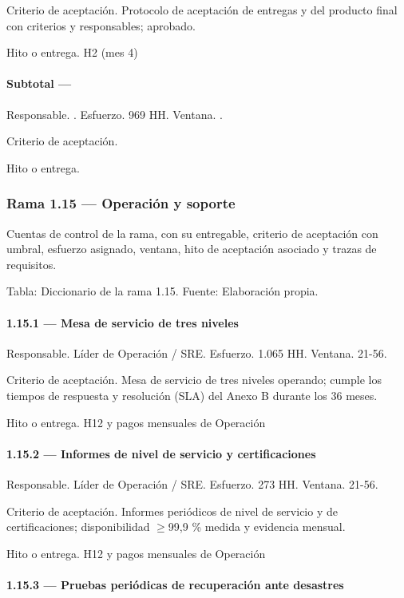 \documentclass[11pt]{article}
\begin{document}
Criterio de aceptación. Protocolo de aceptación de entregas y del producto final con criterios y responsables; aprobado.

Hito o entrega. H2 (mes 4)

\paragraph{Subtotal — }

Responsable. . Esfuerzo. 969 HH. Ventana. .

Criterio de aceptación.

Hito o entrega.

\subsubsection{Rama 1.15 — Operación y soporte}

Cuentas de control de la rama, con su entregable, criterio de aceptación con umbral, esfuerzo asignado, ventana, hito de aceptación asociado y trazas de requisitos.

Tabla: Diccionario de la rama 1.15. Fuente: Elaboración propia.

\paragraph{1.15.1 — Mesa de servicio de tres niveles}

Responsable. Líder de Operación / SRE. Esfuerzo. 1.065 HH. Ventana. 21-56.

Criterio de aceptación. Mesa de servicio de tres niveles operando; cumple los tiempos de respuesta y resolución (SLA) del Anexo B durante los 36 meses.

Hito o entrega. H12 y pagos mensuales de Operación

\paragraph{1.15.2 — Informes de nivel de servicio y certificaciones}

Responsable. Líder de Operación / SRE. Esfuerzo. 273 HH. Ventana. 21-56.

Criterio de aceptación. Informes periódicos de nivel de servicio y de certificaciones; disponibilidad \(\geq\)99,9 \% medida y evidencia mensual.

Hito o entrega. H12 y pagos mensuales de Operación

\paragraph{1.15.3 — Pruebas periódicas de recuperación ante desastres}
\end{document}
